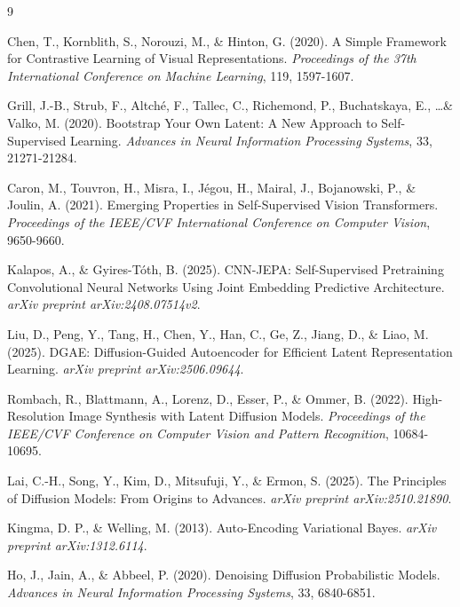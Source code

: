 \begin{thebibliography}{9}

Chen, T., Kornblith, S., Norouzi, M., \& Hinton, G. (2020).
A Simple Framework for Contrastive Learning of Visual Representations.
\textit{Proceedings of the 37th International Conference on Machine Learning}, 119, 1597-1607.

Grill, J.-B., Strub, F., Altché, F., Tallec, C., Richemond, P., Buchatskaya, E., \ldots \& Valko, M. (2020).
Bootstrap Your Own Latent: A New Approach to Self-Supervised Learning.
\textit{Advances in Neural Information Processing Systems}, 33, 21271-21284.

Caron, M., Touvron, H., Misra, I., Jégou, H., Mairal, J., Bojanowski, P., \& Joulin, A. (2021).
Emerging Properties in Self-Supervised Vision Transformers.
\textit{Proceedings of the IEEE/CVF International Conference on Computer Vision}, 9650-9660.

Kalapos, A., \& Gyires-Tóth, B. (2025).
CNN-JEPA: Self-Supervised Pretraining Convolutional Neural Networks Using Joint Embedding Predictive Architecture.
\textit{arXiv preprint arXiv:2408.07514v2}.

Liu, D., Peng, Y., Tang, H., Chen, Y., Han, C., Ge, Z., Jiang, D., \& Liao, M. (2025).
DGAE: Diffusion-Guided Autoencoder for Efficient Latent Representation Learning.
\textit{arXiv preprint arXiv:2506.09644}.

Rombach, R., Blattmann, A., Lorenz, D., Esser, P., \& Ommer, B. (2022).
High-Resolution Image Synthesis with Latent Diffusion Models.
\textit{Proceedings of the IEEE/CVF Conference on Computer Vision and Pattern Recognition}, 10684-10695.

Lai, C.-H., Song, Y., Kim, D., Mitsufuji, Y., \& Ermon, S. (2025).
The Principles of Diffusion Models: From Origins to Advances.
\textit{arXiv preprint arXiv:2510.21890}.

Kingma, D. P., \& Welling, M. (2013).
Auto-Encoding Variational Bayes.
\textit{arXiv preprint arXiv:1312.6114}.

Ho, J., Jain, A., \& Abbeel, P. (2020).
Denoising Diffusion Probabilistic Models.
\textit{Advances in Neural Information Processing Systems}, 33, 6840-6851.


\end{thebibliography}
